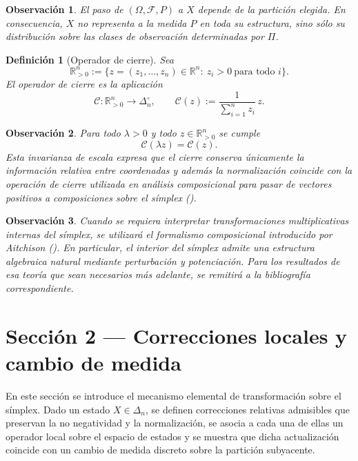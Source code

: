 \documentclass[12pt]{article}
\newtheorem{definicion}{Definición}[section]
\newtheorem{observacion}{Observación}[section]
\begin{document}
\begin{observacion}
El paso de $(\Omega,\mathcal F,P)$ a $X$ depende de la partición elegida. En consecuencia, $X$ no representa a la medida $P$ en toda su estructura, sino sólo su distribución sobre las clases de observación determinadas por $\Pi$.
\end{observacion}

\begin{definicion}[Operador de cierre]\label{def:cierre}
Sea
\[
\mathbb R_{>0}^n:=\{z=(z_1,\dots,z_n)\in\mathbb R^n:\ z_i>0\ \text{para todo } i\}.
\]
El \emph{operador de cierre} es la aplicación
\[
\mathscr{C}:\mathbb R_{>0}^n\to\Delta_n^\circ,
\qquad
\mathscr{C}(z):=\frac{1}{\sum_{i=1}^n z_i}\,z.
\]
\end{definicion}

\begin{observacion}
Para todo $\lambda>0$ y todo $z\in\mathbb R_{>0}^n$ se cumple
\[
\mathscr{C}(\lambda z)=\mathscr{C}(z).
\]
Esta invarianza de escala expresa que el cierre conserva únicamente la información relativa entre coordenadas y además la normalización coincide con la operación de cierre utilizada en análisis composicional para pasar de vectores positivos a composiciones sobre el símplex (\cite{Aitchison1986}).
\end{observacion}

\begin{observacion}
Cuando se requiera interpretar transformaciones multiplicativas internas del símplex, se utilizará el formalismo composicional introducido por Aitchison (\cite{Aitchison1986}). En particular, el interior del símplex admite una estructura algebraica natural mediante perturbación y potenciación. Para los resultados de esa teoría que sean necesarios más adelante, se remitirá a la bibliografía correspondiente.
\end{observacion}
\section{Sección 2 — Correcciones locales y cambio de medida}

En este sección  se introduce el mecanismo elemental de transformación sobre el símplex. Dado un estado $X\in\Delta_n$, se definen correcciones relativas admisibles que preservan la no negatividad y la normalización, se asocia a cada una de ellas un operador local sobre el espacio de estados y se muestra que dicha actualización coincide con un cambio de medida discreto sobre la partición subyacente.
\end{document}
